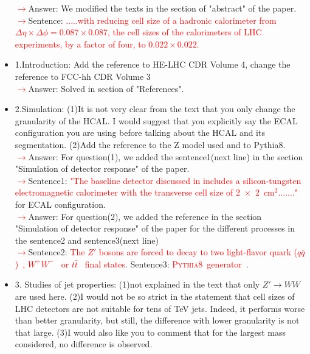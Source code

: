 \documentclass[final,1p,11pt]{elsarticle}
\newcommand{\pythia} {\textsc{Pythia8~}}
\begin{document}
\begin{itemize}
 \textcolor{red}{$\rightarrow$}Answer: We modified the texts in the section of "abstract" of the paper.\\
 \textcolor{red}{$\rightarrow$}Sentence: \textcolor{red}{.....with reducing cell size of a hadronic calorimeter from $\Delta \eta \times \Delta \phi = 0.087\times0.087$, the cell sizes of the calorimeters of LHC experiments, by a factor of four, to  $0.022\times0.022$.} 
\item 1.Introduction: Add the reference to HE-LHC CDR Volume 4, change the reference to FCC-hh CDR Volume 3\\
 \textcolor{red}{$\rightarrow$}Answer: Solved in section of "References".
\item 2.Simulation: (1)It is not very clear from the text that you only change the granularity of the HCAL. I would suggest that you explicitly say the ECAL configuration you are using before talking about the HCAL and its segmentation.
(2)Add the reference to the Z model used and to Pythia8.\\
 \textcolor{red}{$\rightarrow$}Answer: For question(1), we added the sentence1(next line) in the section "Simulation of detector response" of the paper.\\
 \textcolor{red}{$\rightarrow$}Sentence1: \textcolor{red}{"The baseline detector discussed in \cite{Chekanov:2016ppq}
includes a silicon-tungsten electromagnetic calorimeter with the transverse cell size of 2~$\times$~2~cm$^2$......."} for ECAL configuration.\\
 \textcolor{red}{$\rightarrow$}Answer: For question(2), we added the reference in the section "Simulation of detector response" of the paper for the different processes in the sentence2 and sentence3(next line)\\
\textcolor{red}{$\rightarrow$}Sentence2:  \textcolor{red}{The $Z'$ bosons are forced to decay to two light-flavor quark ($q\bar{q}$)~\cite{Sirunyan:2018xlo}, $W^+W^-$~\cite{Sirunyan:2017acf} or $t\bar{t}$~\cite{Sirunyan:2018ryr} final states}. Sentence3: \textcolor{red}{\pythia generator~\cite{Sjostrand:2006za}}.\\
\item 3. Studies of jet properties: (1)not explained in the text that only $Z' \rightarrow WW$ are used here. (2)I would not be so strict in the statement that cell sizes of LHC detectors are not suitable for tens of TeV jets. Indeed, it performs worse than better granularity, but still, the difference with lower granularity is not that large. (3)I would also like you to comment that for the largest mass considered, no difference is observed.\\

\end{itemize}
\end{document}
